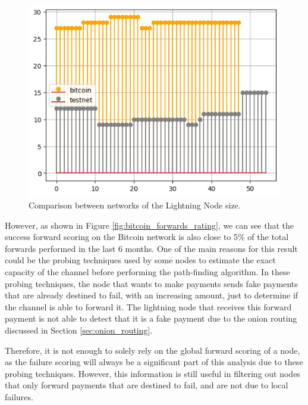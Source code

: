 \begin{figure}[H]
    \begin{center}
      \includegraphics[scale=0.7]{imgs/bitcoin_vs_testnet_channels_size.png}
    \end{center}
    \caption{Comparison between networks of the Lightning Node size.}
    \label{fig:bitcoin_vs_testnet_channels_size}
\end{figure}

However, as shown in Figure \ref{fig:bitcoin_forwards_rating}, we can see that the success
forward scoring on the Bitcoin network is also close to 5\% of the total forwards performed 
in the last 6 months. One of the main reasons for this result could be the probing techniques 
used by some nodes to estimate the exact capacity of the channel before performing the path-finding
algorithm. In these probing techniques, the node that wants to make payments sends fake payments
that are already destined to fail, with an increasing amount, just to determine if the channel 
is able to forward it. The lightning node that receives this forward payment is not able to 
detect that it is a fake payment due to the onion routing discussed in Section \ref{sec:onion_routing}.

Therefore, it is not enough to solely rely on the global forward scoring of a node, 
as the failure scoring will always be a significant part of this analysis due to these 
probing techniques. However, this information is still useful in filtering out nodes 
that only forward payments that are destined to fail, and are not due to local failures.

